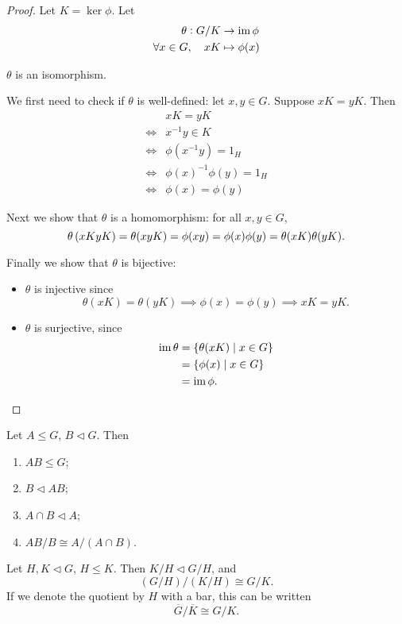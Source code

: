 \begin{proof}
Let $K=\ker\phi$. 
Let
\begin{align*}
\theta:G/K&\to\operatorname{im}\phi\\
\forall x\in G,\quad xK&\mapsto\phi(x)
\end{align*}
\begin{claim}
$\theta$ is an isomorphism.
\end{claim}
We first need to check if $\theta$ is well-defined: let $x,y\in G$. Suppose $xK=yK$. Then
\begin{align*}
&xK=yK\\
\iff& x^{-1}y\in K\\
\iff&\phi(x^{-1}y)=1_H\\
\iff&\phi(x)^{-1}\phi(y)=1_H\\
\iff&\phi(x)=\phi(y)
\end{align*}

Next we show that $\theta$ is a homomorphism: for all $x,y\in G$,
\[\theta\left(xKyK\right)=\theta(xyK)=\phi(xy)=\phi(x)\phi(y)=\theta(xK)\theta(yK).\]

Finally we show that $\theta$ is bijective:
\begin{itemize}
\item $\theta$ is injective since
\[\theta(xK)=\theta(yK)\implies\phi(x)=\phi(y)\implies xK=yK.\]
\item $\theta$ is surjective, since
\begin{align*}
\operatorname{im}\theta&=\{\theta(xK)\mid x\in G\}\\
&=\{\phi(x)\mid x\in G\}\\
&=\operatorname{im}\phi.
\end{align*}
\end{itemize}
\end{proof}

\begin{theorem}
Let $A\le G$, $B\triangleleft G$. Then
\begin{enumerate}[label=(\roman*)]
\item $AB\le G$;
\item $B\triangleleft AB$;
\item $A\cap B\triangleleft A$;
\item $AB/B\cong A/(A\cap B)$.
\end{enumerate}
\end{theorem}

\begin{theorem}
Let $H,K\triangleleft G$, $H\le K$. Then $K/H\triangleleft G/H$, and
\[(G/H)/(K/H)\cong G/K.\]
If we denote the quotient by $H$ with a bar, this can be written
\[\overline{G}/\overline{K}\cong G/K.\]
\end{theorem}

